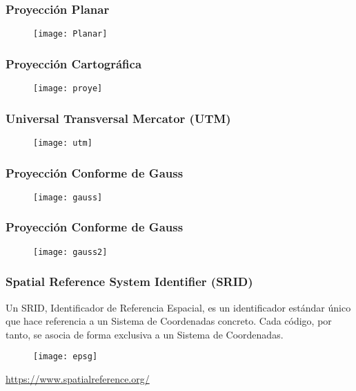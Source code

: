\documentclass[14pt]{beamer}
\begin{document}
\begin{frame}
\frametitle{Proyección Planar}
  \begin{figure}
    \centering
    \texttt{[image: Planar]}
  \end{figure}
\end{frame}
\begin{frame}
\frametitle{Proyección Cartográfica}
  \begin{figure}
    \centering
    \texttt{[image: proye]}
  \end{figure}
\end{frame}
\begin{frame}
\frametitle{Universal Transversal Mercator (UTM)}
  \begin{figure}
    \centering
    \texttt{[image: utm]}
  \end{figure}
\end{frame}
\begin{frame}
\frametitle{Proyección Conforme de Gauss}
  \begin{figure}
    \centering
    \texttt{[image: gauss]}
  \end{figure}
\end{frame}
\begin{frame}
\frametitle{Proyección Conforme de Gauss}
  \begin{figure}
    \centering
    \texttt{[image: gauss2]}
  \end{figure}
\end{frame}
\begin{frame}
\frametitle{Spatial Reference System Identifier (SRID)}
\scriptsize{Un SRID, Identificador de Referencia Espacial, es un identificador estándar único que hace referencia a un Sistema de Coordenadas concreto. Cada código, por tanto, se asocia de forma exclusiva a un Sistema de Coordenadas.}
  \begin{figure}
    \centering
    \texttt{[image: epsg]}
  \end{figure}
\url{https://www.spatialreference.org/}
\end{frame}
\end{document}
